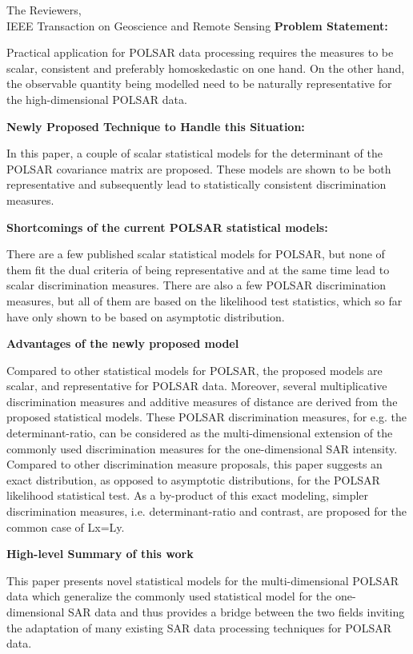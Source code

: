 \documentclass{letter}
\begin{document}
\begin{letter}{The Reviewers,\\IEEE Transaction on Geoscience and Remote Sensing}
\textbf{Problem Statement:}

Practical application for POLSAR data processing requires the measures to be scalar, consistent and preferably homoskedastic on one hand.
On the other hand, the observable quantity being modelled need to be naturally representative for the high-dimensional POLSAR data.

\textbf{Newly Proposed Technique to Handle this Situation:}

In this paper, a couple of scalar statistical models for the determinant of the POLSAR covariance matrix are proposed.
These models are shown to be both representative and subsequently lead to statistically consistent discrimination measures.

\textbf{Shortcomings of the current POLSAR statistical models:}

There are a few published scalar statistical models for POLSAR, but none of them fit the dual criteria of being representative and at the same time lead to scalar discrimination measures.
There are also a few POLSAR discrimination measures, but all of them are based on the likelihood test statistics, which so far have only shown to be based on asymptotic distribution.

\textbf{Advantages of the newly proposed model}

Compared to other statistical models for POLSAR, the proposed models are scalar, and representative for POLSAR data.
Moreover, several multiplicative discrimination measures and additive measures of distance are derived from the proposed statistical models.
These POLSAR discrimination measures, for e.g. the determinant-ratio, can be considered as the multi-dimensional extension of the commonly used discrimination measures for the one-dimensional SAR intensity.
Compared to other discrimination measure proposals, this paper suggests an exact distribution, as opposed to asymptotic distributions, for the POLSAR likelihood statistical test.
As a by-product of this exact modeling, simpler discrimination measures, i.e. determinant-ratio and contrast, are proposed for the common case of Lx=Ly.

\textbf{High-level Summary of this work}

This paper presents novel statistical models for the multi-dimensional POLSAR data which generalize the commonly used statistical model for the one-dimensional SAR data and thus provides a bridge between the two fields inviting the adaptation of many existing SAR data processing techniques for POLSAR data.

\end{letter}
 
\end{document}
